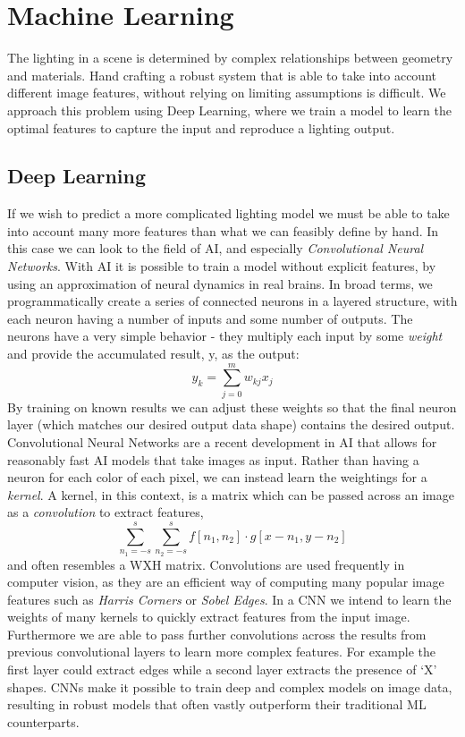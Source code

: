 \documentclass[ %
                    author={Gavin Parker},
                supervisor={Dr. Neill Campbell},
                    degree={MEng},
                     title={Deep Learning for Illumination Estimation from Stereo Images},
                  subtitle={},
                      type={Research},
                      year={2018} ]{dissertation}
\begin{document}
\section{Machine Learning}
The lighting in a scene is determined by complex relationships between geometry and materials. Hand crafting a robust system that is able to take into account different image features, without relying on limiting assumptions is difficult. We approach this problem using Deep Learning, where we train a model to learn the optimal features to capture the input and reproduce a lighting output.
\newline
\subsection{Deep Learning}
If we wish to predict a more complicated lighting model we must be able to take into account many more features than what we can feasibly define by hand. In this case we can look to the field of AI, and especially \textit{Convolutional Neural Networks}. With AI it is possible to train a model without explicit features, by using an approximation of neural dynamics in real brains. In broad terms, we programmatically create a series of connected neurons in a layered structure, with each neuron having a number of inputs and some number of outputs. The neurons have a very simple behavior - they multiply each input by some \textit{weight} and provide the accumulated result, y, as the output:
\[y_k = \sum_{j=0}^{m}{w_{kj}x_j}\]
By training on known results we can adjust these weights so that the final neuron layer (which matches our desired output data shape) contains the desired output.
\newline
Convolutional Neural Networks are a recent development in AI that allows for reasonably fast AI models that take images as input. Rather than having a neuron for each color of each pixel, we can instead learn the weightings for a \textit{kernel}. A kernel, in this context, is a matrix which can be passed across an image as a \textit{convolution} to extract features,
\[\sum_{n_1=-s}^{s}{\sum_{n_2=-s}^{s}{f[n_1, n_2]\cdot g[x-n_1,y-n_2]}} \]
and often resembles a WXH matrix. Convolutions are used frequently in computer vision, as they are an efficient way of computing many popular image features such as \textit{Harris Corners} or \textit{Sobel Edges}. In a CNN we intend to learn the weights of many kernels to quickly extract features from the input image. Furthermore we are able to pass further convolutions across the results from previous convolutional layers to learn more complex features. For example the first layer could extract edges while a second layer extracts the presence of `X' shapes. CNNs make it possible to train deep and complex models on image data, resulting in robust models that often vastly outperform their traditional ML counterparts.
\end{document}
